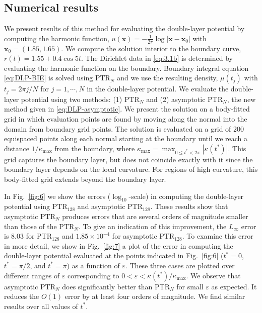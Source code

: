 \documentclass{article}[12pt]
\renewcommand{\epsilon}{\varepsilon}
\numberwithin{equation}{section}
\begin{document}
\subsection{Numerical results}\label{ssec:DLPresults}

We present results of this method for evaluating the double-layer
potential by computing the harmonic function,
$u(\mathbf{x}) = -\frac{1}{2\pi} \log | \mathbf{x} - \mathbf{x}_{0} |$
with $\mathbf{x}_{0} ={ (1.85,1.65)}$.  We compute the solution
interior to the boundary curve, $r(t) = 1.55 + 0.4 \cos 5 t$.  The
Dirichlet data in \eqref{eq:3.1b} is determined by evaluating the
harmonic function on the boundary.  Boundary integral equation
\eqref{eq:DLP-BIE} is solved using PTR$_{N}$ and we
use the resulting density, $\mu(t_{j})$ with $t_{j} = 2\pi j/N$ for
$j = 1, \cdots, N$ in the double-layer potential. We evaluate the
double-layer potential using two methods: (1)
  PTR$_{N}$ and (2) asymptotic PTR$_{N}$, the new method given in
\eqref{eq:DLP-asymptotic}.  We present the solution on a body-fitted
grid in which evaluation points are found by moving
along the normal into the domain from boundary grid
points.  The solution is evaluated on a grid of $200$ equispaced
points along each normal starting at the boundary until we reach a
distance $1/\kappa_{\max}$ from the boundary, where
$\kappa_{\max} = \max_{0 \le t^{\ast} < 2 \pi} |\kappa(t^{\ast})|$.
This grid captures the boundary layer, but does not coincide exactly
with it since the boundary layer depends on the local curvature.
For regions of high curvature, this body-fitted grid
extends beyond the boundary layer.
  
In {Fig.}~\ref{fig:6} we show the errors
  ($\log_{10}$-scale) in computing the double-layer potential using
  PTR$_{128}$ and asymptotic PTR$_{128}$. These results show that
asymptotic PTR$_{N}$ produces errors that are several
orders of magnitude smaller than those of the
PTR$_{N}$. To give an indication of this
improvement, the $L_{\infty}$ error is $8.03$ for
PTR$_{128}$ and $1.85 \times 10^{-4}$ for asymptotic
PTR$_{128}$. To examine this error in more detail,
we show in {Fig.}~\ref{fig:7} a plot of the error in computing the
double-layer potential evaluated at the points indicated in
Fig.~\ref{fig:6} ($t^{\ast} = 0$, $t^{\ast} = \pi/2$, and
$t^{\ast} = \pi$) as a function of $\epsilon$.  These three cases are
plotted over different ranges of $\epsilon$ corresponding to
$0 < \epsilon < \kappa(t^{\ast})/\kappa_{\max}$.  We observe that
asymptotic PTR$_{N}$ does significantly better than
PTR$_{N}$ for small $\epsilon$ as expected. It
reduces the $O(1)$ error by at least four orders of magnitude.  We
find similar results over all values of
$t^{\ast}$.
\end{document}
